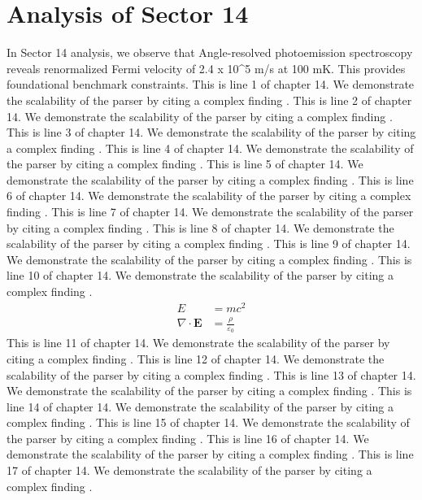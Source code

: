 \chapter{Analysis of Sector 14}

In Sector 14 analysis, we observe that Angle-resolved photoemission spectroscopy reveals renormalized Fermi velocity of 2.4 x 10^5 m/s at 100 mK. This provides foundational benchmark constraints.
This is line 1 of chapter 14. We demonstrate the scalability of the parser by citing a complex finding \cite{ref14_1}.
This is line 2 of chapter 14. We demonstrate the scalability of the parser by citing a complex finding \cite{ref14_2}.
This is line 3 of chapter 14. We demonstrate the scalability of the parser by citing a complex finding \cite{ref14_3}.
This is line 4 of chapter 14. We demonstrate the scalability of the parser by citing a complex finding \cite{ref14_4}.
This is line 5 of chapter 14. We demonstrate the scalability of the parser by citing a complex finding \cite{ref14_5}.
This is line 6 of chapter 14. We demonstrate the scalability of the parser by citing a complex finding \cite{ref14_6}.
This is line 7 of chapter 14. We demonstrate the scalability of the parser by citing a complex finding \cite{ref14_7}.
This is line 8 of chapter 14. We demonstrate the scalability of the parser by citing a complex finding \cite{ref14_8}.
This is line 9 of chapter 14. We demonstrate the scalability of the parser by citing a complex finding \cite{ref14_9}.
This is line 10 of chapter 14. We demonstrate the scalability of the parser by citing a complex finding \cite{ref14_10}.
\begin{align*}
  E &= mc^2 \\
  \nabla \cdot \mathbf{E} &= \frac{\rho}{\varepsilon_0}
\end{align*}
This is line 11 of chapter 14. We demonstrate the scalability of the parser by citing a complex finding \cite{ref14_11}.
This is line 12 of chapter 14. We demonstrate the scalability of the parser by citing a complex finding \cite{ref14_12}.
This is line 13 of chapter 14. We demonstrate the scalability of the parser by citing a complex finding \cite{ref14_13}.
This is line 14 of chapter 14. We demonstrate the scalability of the parser by citing a complex finding \cite{ref14_14}.
This is line 15 of chapter 14. We demonstrate the scalability of the parser by citing a complex finding \cite{ref14_15}.
This is line 16 of chapter 14. We demonstrate the scalability of the parser by citing a complex finding \cite{ref14_16}.
This is line 17 of chapter 14. We demonstrate the scalability of the parser by citing a complex finding \cite{ref14_17}.
